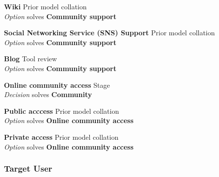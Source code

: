 \textbf{Wiki} \hfill Prior model collation \cite{Aghaee2012} \\ \emph{Option} \hfill solves \textbf{Community support}


\textbf{Social Networking Service (SNS) Support} \hfill Prior model collation \cite{Grammel2010} \\ \emph{Option} \hfill solves \textbf{Community support}

\textbf{Blog} \hfill Tool review \\ \emph{Option} \hfill solves \textbf{Community support}

\textbf{Online community access} \hfill Stage \cite{Aghaee2012} \\ \emph{Decision} \hfill solves \textbf{Community}


\textbf{Public acccess} \hfill Prior model collation \cite{Aghaee2012} \\ \emph{Option} \hfill solves \textbf{Online community access}


\textbf{Private access} \hfill Prior model collation \cite{Aghaee2012} \\ \emph{Option} \hfill solves \textbf{Online community access}


\subsubsection{Target User}

